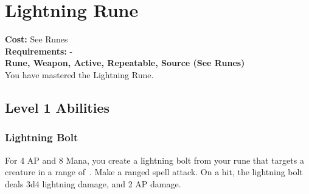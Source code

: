 \twocolumn
\section{Lightning Rune}\label{rune:lightning}
\textbf{Cost:} See Runes\\
\textbf{Requirements:} -\\
\textbf{Rune, Weapon, Active, Repeatable, Source (See Runes)}\\
You have mastered the Lightning Rune.

\subsection{Level 1 Abilities}

\subsubsection{Lightning Bolt}
For 4 AP and 8 Mana, you create a lightning bolt from your rune that targets a creature in a range of~.
Make a ranged spell attack.
On a hit, the lightning bolt deals 3d4 lightning damage, and 2 AP damage.